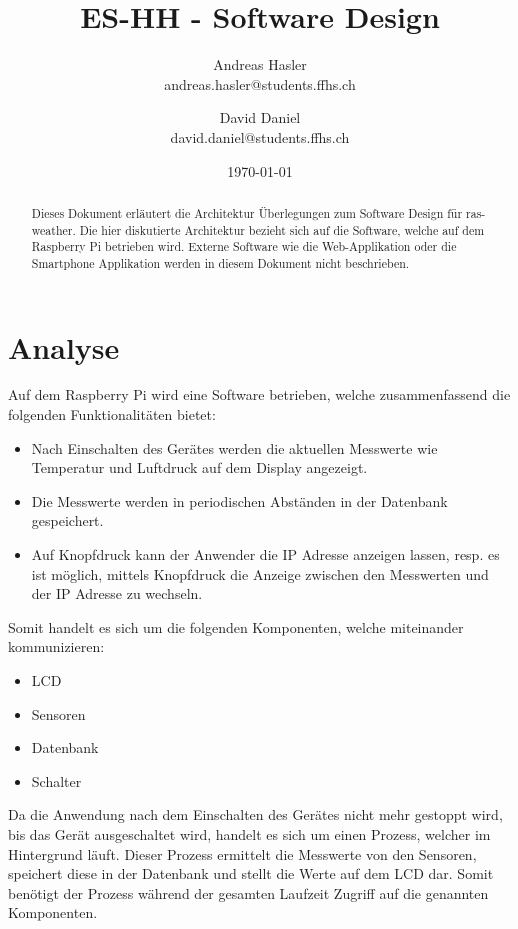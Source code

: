\documentclass[
    10pt,
    a4paper,
]{scrartcl}
\title{ES-HH - Software Design}
\author{Andreas Hasler \\{\small andreas.hasler@students.ffhs.ch}
\and David Daniel\\{\small david.daniel@students.ffhs.ch}}
\date{\today}
\begin{document}
\maketitle
{}%

\begin{abstract}
    Dieses Dokument erläutert die Architektur Überlegungen zum Software Design für
    ras-weather. Die hier diskutierte Architektur bezieht sich auf die Software, welche
    auf dem Raspberry Pi betrieben wird. Externe Software wie die Web-Applikation oder die
    Smartphone Applikation werden in diesem Dokument nicht beschrieben.
\end{abstract}

\clearpage
{}%
\tableofcontents

\section{Analyse}

Auf dem Raspberry Pi wird eine Software betrieben, welche zusammenfassend
\cite{project-doc} die folgenden Funktionalitäten bietet:
\begin{itemize}
    \item Nach Einschalten des Gerätes werden die aktuellen Messwerte wie Temperatur und
        Luftdruck auf dem Display angezeigt.
    \item Die Messwerte werden in periodischen Abständen in der Datenbank gespeichert.
    \item Auf Knopfdruck kann der Anwender die IP Adresse anzeigen lassen, resp. es ist
        möglich, mittels Knopfdruck die Anzeige zwischen den Messwerten und der IP Adresse
        zu wechseln.
\end{itemize}

Somit handelt es sich um die folgenden Komponenten, welche miteinander kommunizieren:

\begin{itemize}
    \item LCD
    \item Sensoren
    \item Datenbank
    \item Schalter
\end{itemize}

Da die Anwendung nach dem Einschalten des Gerätes nicht mehr gestoppt wird, bis das Gerät
ausgeschaltet wird, handelt es sich um einen Prozess, welcher im Hintergrund läuft. Dieser
Prozess ermittelt die Messwerte von den Sensoren, speichert diese in der Datenbank und
stellt die Werte auf dem LCD dar. Somit benötigt der Prozess während der gesamten Laufzeit
Zugriff auf die genannten Komponenten.
\end{document}
